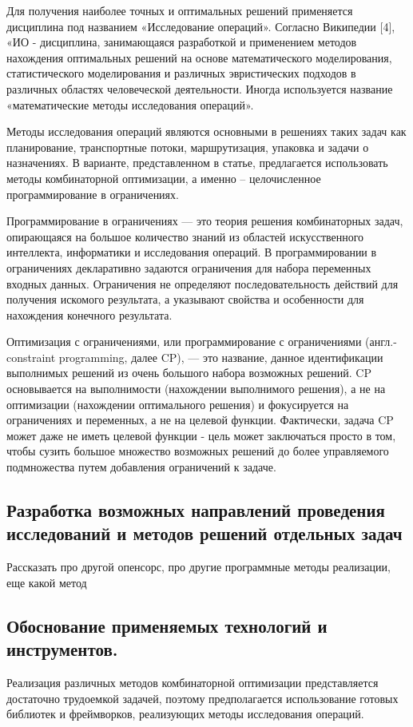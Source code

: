 Для получения наиболее точных и оптимальных решений применяется дисциплина под названием «Исследование операций». Согласно Википедии [4], «ИО - дисциплина, занимающаяся разработкой и применением методов нахождения оптимальных решений на основе математического моделирования, статистического моделирования и различных эвристических подходов в различных областях человеческой деятельности. Иногда используется название «математические методы исследования операций».

Методы исследования операций являются основными в решениях таких задач как планирование, транспортные потоки, маршрутизация, упаковка и задачи о назначениях. В варианте, представленном в статье, предлагается использовать методы комбинаторной оптимизации, а именно – целочисленное программирование в ограничениях.

Программирование в ограничениях — это теория решения комбинаторных задач, опирающаяся на большое количество знаний из областей искусственного интеллекта, информатики и исследования операций. В программировании в ограничениях декларативно задаются ограничения для набора переменных входных данных. Ограничения не определяют последовательность действий для получения искомого результата, а указывают свойства и особенности для нахождения конечного результата. 

Оптимизация с ограничениями, или программирование с ограничениями (англ.- constraint programming, далее CP), — это название, данное идентификации выполнимых решений из очень большого набора возможных решений. CP основывается на выполнимости (нахождении выполнимого решения), а не на оптимизации (нахождении оптимального решения) и фокусируется на ограничениях и переменных, а не на целевой функции. Фактически, задача CP может даже не иметь целевой функции - цель может заключаться просто в том, чтобы сузить большое множество возможных решений до более управляемого подмножества путем добавления ограничений к задаче.

\subsection{Разработка возможных направлений проведения исследований и методов решений отдельных задач}
Рассказать про другой опенсорс, про другие программные методы реализации, еще какой метод

\subsection{Обоснование применяемых технологий и инструментов.}
Реализация различных методов комбинаторной оптимизации представляется достаточно трудоемкой задачей, поэтому предполагается использование готовых библиотек и фреймворков, реализующих методы исследования операций.

